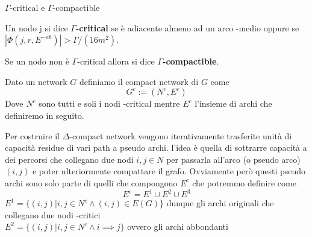     \begin{definition}{$\Gamma$-critical e $\Gamma$-compactible}{}
        
        Un nodo j si dice \textbf{$\Gamma$-critical} se è adiacente almeno ad un arco \gmm-medio oppure se $|\Phi (j, r, E^{-ab})| > \Gamma/(16m^2)$.

        \vspace*{7pt}
        \noindent Se un nodo non è $\Gamma$-critical allora si dice \textbf{$\Gamma$-compactible}.

        \vspace*{7pt}
        \noindent Dato un network $G$ definiamo il \gmm\-compact network di $G$ come \[G^c := (N^c, E^c)\]
        Dove $N^c$ sono tutti e soli i nodi \gmm-critical mentre $E^c$ l'insieme di archi che definiremo in seguito.
    \end{definition}
    Per costruire il $\Delta$-compact network vengono iterativamente trasferite unità di capacità residue di vari path a pseudo archi. 
    l'idea è quella di sottrarre capacità a dei percorsi che collegano due nodi $i,j\in N$ per passarla all'arco (o pseudo arco) $(i,j)$ e poter ulteriormente compattare il grafo.
    Ovviamente però questi pseudo archi sono solo parte di quelli che compongono $E^c$ che potremmo definire come 
    \[E^c = E^1\cup E^2 \cup E^3\]
    $E^1 = \{(i,j) | i,j\in N^c \land (i,j) \in E(G)\}$ dunque gli archi originali che collegano due nodi \gmm-critici\\
    $E^2 = \{(i,j) | i,j\in N^c \land i\implies j\}$ ovvero gli archi abbondanti 

